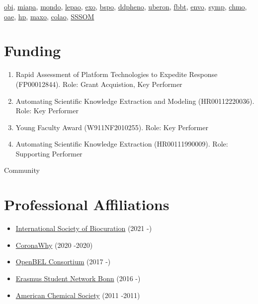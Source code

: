 \documentclass[10pt,a4paper,sans]{moderncv} %
\begin{document}
\href{https://bioregistry.io/wikidata:Q7095051}{obi},        \href{https://bioregistry.io/wikidata:Q81661690}{miapa},        \href{https://bioregistry.io/wikidata:Q27468140}{mondo},        \href{https://bioregistry.io/wikidata:Q113012667}{lepao},        \href{https://bioregistry.io/wikidata:Q113012658}{exo},        \href{https://bioregistry.io/wikidata:Q81661546}{bspo},        \href{https://bioregistry.io/wikidata:Q81661585}{ddpheno},        \href{https://bioregistry.io/wikidata:Q7876491}{uberon},        \href{https://bioregistry.io/wikidata:Q81661620}{fbbt},        \href{https://bioregistry.io/wikidata:Q31110555}{envo},        \href{https://bioregistry.io/wikidata:Q81661810}{symp},        \href{https://bioregistry.io/wikidata:Q55118301}{chmo},        \href{https://bioregistry.io/wikidata:Q81661725}{oae},        \href{https://bioregistry.io/wikidata:Q17027854}{hp},        \href{https://bioregistry.io/wikidata:Q113012668}{maxo},        \href{https://bioregistry.io/wikidata:Q113009128}{colao},        \href{https://bioregistry.io/wikidata:Q108394480}{SSSOM}


\section{Funding}
    \begin{enumerate}
    \item Rapid Assessment of Platform Technologies to Expedite Response (FP00012844). Role: Grant Acquistion, Key Performer
    \item Automating Scientific Knowledge Extraction and Modeling (HR00112220036). Role: Key Performer
    \item Young Faculty Award (W911NF2010255). Role: Key Performer
    \item Automating Scientific Knowledge Extraction (HR00111990009). Role: Supporting Performer
    \end{enumerate}

\hfill \break
{\huge Community}

    \section{Professional Affiliations}
    \begin{itemize}
        \item     \href{https://bioregistry.io/wikidata:Q23809291}{International Society of Biocuration} (2021 -)

        \item     \href{https://bioregistry.io/wikidata:Q95587147}{CoronaWhy} (2020 -2020)

        \item     \href{https://bioregistry.io/wikidata:}{OpenBEL Consortium} (2017 -)

        \item     \href{https://bioregistry.io/wikidata:Q655757}{Erasmus Student Network Bonn} (2016 -)

        \item     \href{https://bioregistry.io/wikidata:Q247556}{American Chemical Society} (2011 -2011)

    \end{itemize}
\end{document}
